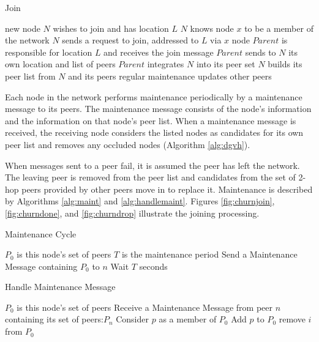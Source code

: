 \documentclass[11pt]{IEEEtran} %
\begin{document}
\begin{algorithm}
\caption{Join}
\label{alg:join}
\begin{algorithmic}[1]  %
\STATE new node $N$ wishes to join and has location $L$
\STATE $N$ knows node $x$ to be a member of the network
\STATE $N$ sends a request to join, addressed to $L$ via $x$
\STATE node $Parent$ is responsible for location $L$ and receives the join message
\STATE $Parent$ sends to $N$ its own location and list of peers
\STATE $Parent$ integrates $N$ into its peer set
\STATE $N$ builds its peer list from $N$ and its peers
\STATE regular maintenance updates other peers
\end{algorithmic}
\end{algorithm}


Each node in the network performs maintenance periodically by a maintenance message to its peers. The maintenance message consists of the node's information and the information on that node's peer list. When a maintenance message is received, the receiving node considers the listed nodes as candidates for its own peer list and removes any occluded nodes (Algorithm \ref{alg:dgvh}). 




When messages sent to a peer fail, it is assumed the peer has left the network. The leaving peer is removed from the peer list and candidates from the set of 2-hop peers provided by other peers move in to replace it.  Maintenance is described by Algorithms \ref{alg:maint} and \ref{alg:handlemaint}.  Figures \ref{fig:churnjoin}, \ref{fig:churndone}, and \ref{fig:churndrop} illustrate the joining processing.

\begin{algorithm}
\caption{Maintenance Cycle}
\label{alg:maint}
\begin{algorithmic}[1]  %
	\STATE $P_0$ is this node's set of peers
    \STATE $T$ is the maintenance period
        	\STATE Send a Maintenance Message containing $P_0$ to $n$
        \ENDFOR
    \STATE Wait $T$ seconds
    \ENDWHILE
\end{algorithmic}
\end{algorithm}


\begin{algorithm}
\caption{Handle Maintenance Message}
\label{alg:handlemaint}
\begin{algorithmic}[1]  %
	\STATE $P_0$ is this node's set of peers
	\STATE Receive a Maintenance Message from peer $n$ containing its set of peers:$P_n$
    	\STATE Consider $p$ as a member of $P_0$
        	\STATE Add $p$ to $P_0$
                	\STATE remove $i$ from $P_0$
                \ENDIF
            \ENDFOR
        \ENDIF
    \ENDFOR
\end{algorithmic}
\end{algorithm}
\end{document}
